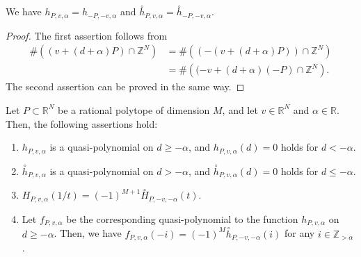 \documentclass[ALCO,published]{cedram}
\theoremstyle{remark}
\begin{document}
\begin{lem}\label{lem:sym}
We have $h_{P,v,\alpha} = h_{-P,-v,\alpha}$ and $\overset{\circ}{h}_{P,v,\alpha} = \overset{\circ}{h}_{-P,-v,\alpha}$. 
\end{lem}
\begin{proof}
The first assertion follows from
\begin{align*}
\# \left( (v + (d + \alpha) P) \cap \mathbb{Z}^N \right) 
&= \# \left( (- (v + (d + \alpha) P)) \cap \mathbb{Z}^N \right) \\
&= \# \left( (-v + (d + \alpha) (-P) \cap \mathbb{Z}^N \right). 
\end{align*}
The second assertion can be proved in the same way.
\end{proof}

\begin{thm}\label{thm:Eh}
Let $P \subset \mathbb{R}^N$ be a rational polytope of dimension $M$, and let $v \in \mathbb{R}^N$ and $\alpha \in \mathbb{R}$. 
Then, the following assertions hold: 
\begin{enumerate}
\item $h_{P, v, \alpha}$ is a quasi-polynomial on $d \ge - \alpha$, and 
$h_{P, v, \alpha}(d) = 0$ holds for $d < - \alpha$. 

\item $\overset{\circ}{h} _{P, v, \alpha}$ is a quasi-polynomial on $d > - \alpha$, and 
$\overset{\circ}{h} _{P, v, \alpha}(d) = 0$ holds for $d \le - \alpha$. 

\item $H_{P, v, \alpha}(1/t) = (-1)^{M+1} \overset{\circ}{H}_{P, -v, - \alpha}(t)$. 

\item 
Let $f_{P,v,\alpha}$ be the corresponding quasi-polynomial to the function $h_{P, v, \alpha}$ on $d \ge - \alpha$. 
Then, we have 
$f_{P,v,\alpha}(-i) = (-1)^M \overset{\circ}{h}_{P, -v, - \alpha}(i)$ for any $i \in \mathbb{Z}_{> \alpha}$. 
\end{enumerate}
\end{thm}
\end{document}
